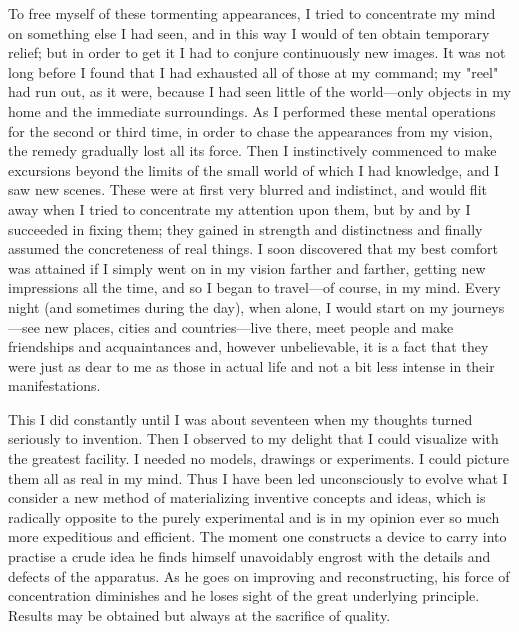 \documentclass[a4paper,12pt,english,twoside,openright]{memoir}
\begin{document}
	
	To free myself of these tormenting appearances, I tried to concentrate my mind on something 
	else I had seen, and in this way I would of ten obtain temporary relief; but in order to get it I had to 
	conjure continuously new images.  It was not long before I found that I had exhausted all of those 
	at my command; my "reel" had run out, as it were, because I had seen little of the world—only 
	objects in my home and the immediate surroundings.  As I performed these mental operations for 
	the second or third time, in order to chase the appearances from my vision, the remedy gradually 
	lost all its force.  Then I instinctively commenced to make excursions beyond the limits of the 
	small world of which I had knowledge, and I saw new scenes.  These were at first very blurred 
	and indistinct, and would flit away when I tried to concentrate my attention upon them, but by and 
	by I succeeded in fixing them; they gained in strength and distinctness and finally assumed the 
	concreteness of real things.  I soon discovered that my best comfort was attained if I simply went 
	on in my vision farther and farther, getting new impressions all the time, and so I began to 
	travel—of course, in my mind.  Every night (and sometimes during the day), when alone, I would 
	start on my journeys—see new places, cities and countries—live there, meet people and make 
	friendships and acquaintances and, however unbelievable, it is a fact that they were just as dear 
	to me as those in actual life and not a bit less intense in their manifestations.  
	

	This I did constantly until I was about seventeen when my thoughts turned seriously to invention.  
	Then I observed to my delight that I could visualize with the greatest facility.  I needed no models, 
	drawings or experiments.  I could picture them all as real in my mind.  Thus I have been led 
	unconsciously to evolve what I consider a new method of materializing inventive concepts and 
	ideas, which is radically opposite to the purely experimental and is in my opinion ever so much 
	more expeditious and efficient.  The moment one constructs a device to carry into practise a 
	crude idea he finds himself unavoidably engrost with the details and defects of the apparatus.  As 
	he goes on improving and reconstructing, his force of concentration diminishes and he loses sight 
	of the great underlying principle.  Results may be obtained but always at the sacrifice of quality.  
	
		
	
\end{document}
